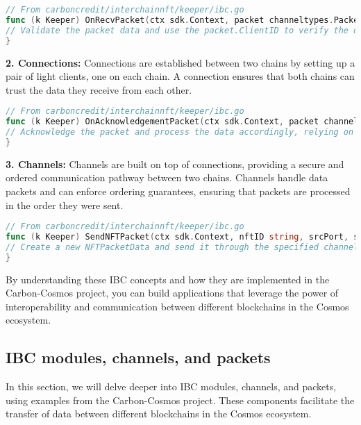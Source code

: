 \documentclass{article}
\begin{document}
\begin{lstlisting}[language=Go]
// From carboncredit/interchainnft/keeper/ibc.go
func (k Keeper) OnRecvPacket(ctx sdk.Context, packet channeltypes.Packet, data types.NFTPacketData) error {
// Validate the packet data and use the packet.ClientID to verify the data from the other chain
}
\end{lstlisting}

\textbf{2. Connections:} Connections are established between two chains by setting up a pair of light clients, one on each chain. A connection ensures that both chains can trust the data they receive from each other.

\begin{lstlisting}[language=Go]
// From carboncredit/interchainnft/keeper/ibc.go
func (k Keeper) OnAcknowledgementPacket(ctx sdk.Context, packet channeltypes.Packet, data types.NFTPacketData, ack channeltypes.Acknowledgement) error {
// Acknowledge the packet and process the data accordingly, relying on the secure connection
}
\end{lstlisting}

\textbf{3. Channels:} Channels are built on top of connections, providing a secure and ordered communication pathway between two chains. Channels handle data packets and can enforce ordering guarantees, ensuring that packets are processed in the order they were sent.

\begin{lstlisting}[language=Go]
// From carboncredit/interchainnft/keeper/ibc.go
func (k Keeper) SendNFTPacket(ctx sdk.Context, nftID string, srcPort, srcChannel string, timeoutHeight clienttypes.Height, timeoutTimestamp uint64, nft types.BaseNFT) error {
// Create a new NFTPacketData and send it through the specified channel
}
\end{lstlisting}

By understanding these IBC concepts and how they are implemented in the Carbon-Cosmos project, you can build applications that leverage the power of interoperability and communication between different blockchains in the Cosmos ecosystem.

\subsection{IBC modules, channels, and packets}

In this section, we will delve deeper into IBC modules, channels, and packets, using examples from the Carbon-Cosmos project. These components facilitate the transfer of data between different blockchains in the Cosmos ecosystem.
\end{document}
